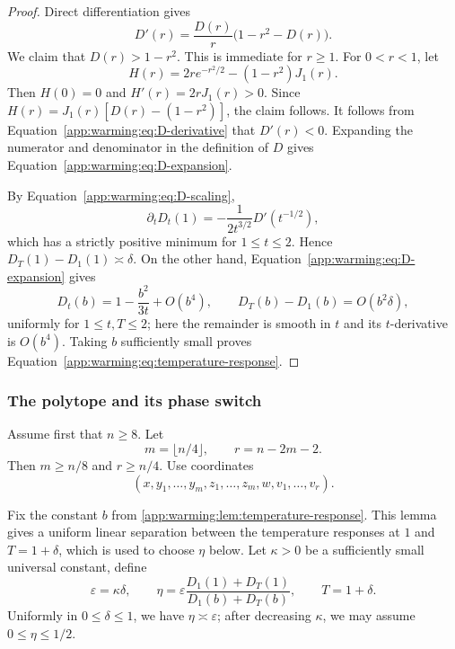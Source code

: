 \documentclass[11pt]{article}
\numberwithin{equation}{section}
\theoremstyle{definition}
\begin{document}
\begin{proof}
Direct differentiation gives
\begin{equation}
  D'(r)=\frac{D(r)}{r}\bigl(1-r^2-D(r)\bigr).
  \label{app:warming:eq:D-derivative}
\end{equation}
We claim that $D(r)>1-r^2$.
This is immediate for $r\geq1$.
For $0<r<1$, let
\[
  H(r)=2re^{-r^2/2}-(1-r^2)J_1(r).
\]
Then $H(0)=0$ and
$H'(r)=2rJ_1(r)>0$.
Since $H(r)=J_1(r)[D(r)-(1-r^2)]$, the claim follows.
It follows from Equation~\eqref{app:warming:eq:D-derivative} that $D'(r)<0$.
Expanding the numerator and denominator in the definition of $D$ gives
Equation~\eqref{app:warming:eq:D-expansion}.

By Equation~\eqref{app:warming:eq:D-scaling},
\[
  \partial_tD_t(1)=-\frac{1}{2t^{3/2}}D'(t^{-1/2}),
\]
which has a strictly positive minimum for $1\leq t\leq2$.
Hence $D_T(1)-D_1(1)\asymp\delta$.
On the other hand, Equation~\eqref{app:warming:eq:D-expansion} gives
\[
D_t(b)=1-\frac{b^2}{3t}+O(b^4),
\qquad
D_T(b)-D_1(b)=O(b^2\delta),
\]
uniformly for $1\leq t,T\leq2$; here the remainder is smooth in
$t$ and its
$t$-derivative is
$O(b^4)$.
Taking $b$ sufficiently small proves
Equation~\eqref{app:warming:eq:temperature-response}.
\end{proof}

\subsubsection{The polytope and its phase switch}
\label{app:warming:sec:polytope}

Assume first that $n\geq8$.
Let
\begin{equation}
m=\lfloor n/4\rfloor,
\qquad
r=n-2m-2.
\label{app:warming:eq:m-r}
\end{equation}
Then $m\geq n/8$ and
$r\geq n/4$.
Use coordinates
\[
  (x,y_1,\ldots,y_m,z_1,\ldots,z_m,w,v_1,\ldots,v_r).
\]

Fix the constant $b$ from \cref{app:warming:lem:temperature-response}.
This lemma gives a uniform linear separation between the temperature responses
at $1$ and
$T=1+\delta$, which is used to choose
$\eta$ below.
Let $\kappa>0$ be a sufficiently small universal constant, define
\begin{equation}
\varepsilon=\kappa\delta,
\qquad
\eta=\varepsilon\frac{D_1(1)+D_T(1)}{D_1(b)+D_T(b)},
\qquad
T=1+\delta.
\label{app:warming:eq:epsilon-eta}
\end{equation}
Uniformly in $0\leq\delta\leq1$, we have
$\eta\asymp\varepsilon$; after decreasing
$\kappa$, we may assume
$0\leq\eta\leq1/2$.
\end{document}
